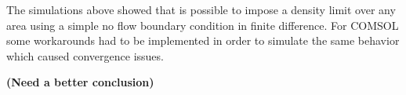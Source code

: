 The simulations above showed that is possible to impose a density limit over any area using a simple no flow boundary condition in finite difference. For COMSOL some workarounds had to be implemented in order to simulate the same behavior which caused convergence issues. 

\textbf{(Need a better conclusion)}
